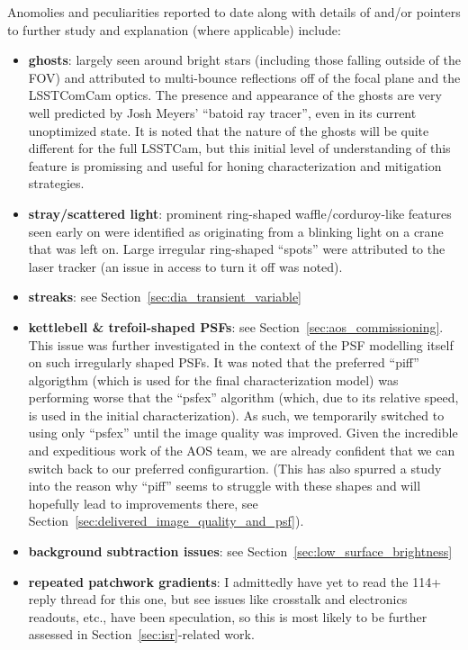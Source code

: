 Anomolies and peculiarities reported to date along with details of and/or pointers
to further study and explanation (where applicable) include:
\begin{itemize}

\item \textbf{ghosts}: largely seen around bright stars (including those falling
  outside of the FOV) and attributed to multi-bounce reflections off of the focal
  plane and the LSSTComCam optics.  The presence and appearance of the ghosts
  are very well predicted by Josh Meyers' ``batoid ray tracer'', even in its
  current unoptimized state.  It is noted that the nature of the ghosts will be
  quite different for the full LSSTCam, but this initial level of understanding
  of this feature is promissing and useful for honing characterization and
  mitigation strategies.

\item \textbf{stray/scattered light}: prominent ring-shaped waffle/corduroy-like
  features seen early on were identified as originating from a blinking light on a
  crane that was left on. Large irregular ring-shaped ``spots'' were attributed to
  the laser tracker (an issue in access to turn it off was noted).

\item \textbf{streaks}: see Section~\ref{sec:dia_transient_variable}

\item \textbf{kettlebell \& trefoil-shaped PSFs}: see Section~\ref{sec:aos_commissioning}.
  This issue was further investigated in the context of the PSF modelling itself on such
  irregularly shaped PSFs.  It was noted that the preferred ``piff'' algorigthm (which
  is used for the final characterization model) was performing worse that the ``psfex''
  algorithm (which, due to its relative speed, is used in the initial characterization).
  As such, we temporarily switched to using only ``psfex'' until the image quality was
  improved.  Given the incredible and expeditious work of the AOS team, we are already
  confident that we can switch back to our preferred configurartion.  (This has also
  spurred a study into the reason why ``piff'' seems to struggle with these shapes and
  will hopefully lead to improvements there, see
  Section~\ref{sec:delivered_image_quality_and_psf}).

\item \textbf{background subtraction issues}: see Section~\ref{sec:low_surface_brightness}

\item \textbf{repeated patchwork gradients}: I admittedly have yet to read the 114+ reply
  thread for this one, but see issues like crosstalk and electronics readouts, etc., have
  been speculation, so this is most likely to be further assessed in
  Section~\ref{sec:isr}-related work.


\end{itemize}
